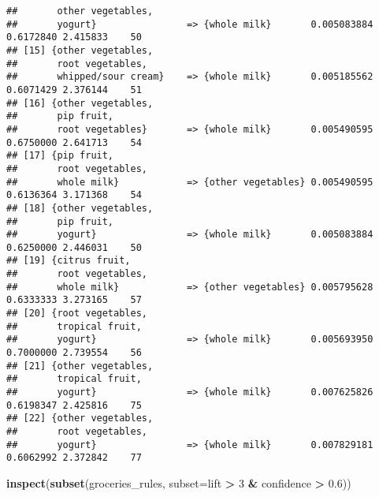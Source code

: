 \documentclass[]{article}
\newenvironment{Shaded}{\begin{snugshade}}{\end{snugshade}}
\newcommand{\KeywordTok}[1]{\textcolor[rgb]{0.13,0.29,0.53}{\textbf{#1}}}
\newcommand{\DataTypeTok}[1]{\textcolor[rgb]{0.13,0.29,0.53}{#1}}
\newcommand{\DecValTok}[1]{\textcolor[rgb]{0.00,0.00,0.81}{#1}}
\newcommand{\FloatTok}[1]{\textcolor[rgb]{0.00,0.00,0.81}{#1}}
\newcommand{\StringTok}[1]{\textcolor[rgb]{0.31,0.60,0.02}{#1}}
\newcommand{\OperatorTok}[1]{\textcolor[rgb]{0.81,0.36,0.00}{\textbf{#1}}}
\newcommand{\NormalTok}[1]{#1}
\begin{document}
\begin{verbatim}
##       other vegetables,                                                                 
##       yogurt}                => {whole milk}       0.005083884  0.6172840 2.415833    50
## [15] {other vegetables,                                                                 
##       root vegetables,                                                                  
##       whipped/sour cream}    => {whole milk}       0.005185562  0.6071429 2.376144    51
## [16] {other vegetables,                                                                 
##       pip fruit,                                                                        
##       root vegetables}       => {whole milk}       0.005490595  0.6750000 2.641713    54
## [17] {pip fruit,                                                                        
##       root vegetables,                                                                  
##       whole milk}            => {other vegetables} 0.005490595  0.6136364 3.171368    54
## [18] {other vegetables,                                                                 
##       pip fruit,                                                                        
##       yogurt}                => {whole milk}       0.005083884  0.6250000 2.446031    50
## [19] {citrus fruit,                                                                     
##       root vegetables,                                                                  
##       whole milk}            => {other vegetables} 0.005795628  0.6333333 3.273165    57
## [20] {root vegetables,                                                                  
##       tropical fruit,                                                                   
##       yogurt}                => {whole milk}       0.005693950  0.7000000 2.739554    56
## [21] {other vegetables,                                                                 
##       tropical fruit,                                                                   
##       yogurt}                => {whole milk}       0.007625826  0.6198347 2.425816    75
## [22] {other vegetables,                                                                 
##       root vegetables,                                                                  
##       yogurt}                => {whole milk}       0.007829181  0.6062992 2.372842    77
\end{verbatim}

\begin{Shaded}
\begin{Highlighting}[]
\KeywordTok{inspect}\NormalTok{(}\KeywordTok{subset}\NormalTok{(groceries_rules, }\DataTypeTok{subset=}\NormalTok{lift }\OperatorTok{>}\StringTok{ }\DecValTok{3} \OperatorTok{&}\StringTok{ }\NormalTok{confidence }\OperatorTok{>}\StringTok{ }\FloatTok{0.6}\NormalTok{))}
\end{Highlighting}
\end{Shaded}
\end{document}

